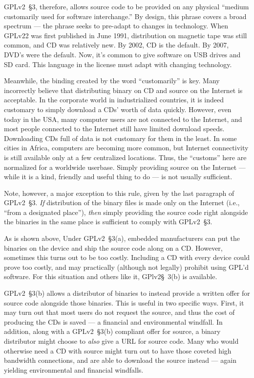 GPLv2~\S3, therefore, allows source code to be provided on any physical
``medium customarily used for software interchange.''  By design, this
phrase covers a broad spectrum --- the phrase seeks to pre-adapt to
changes in  technology.  When GPLv22 was first published in June
1991, distribution on magnetic tape was still common, and CD was
relatively new.  By 2002, CD is the default.  By 2007, DVD's were the
default.  Now, it's common to give software on USB drives and SD card.  This
language in the license must adapt with changing technology.

Meanwhile, the binding created by the word ``customarily'' is key.  Many
incorrectly believe that distributing binary on CD and source on the
Internet is acceptable.  In the corporate world in industrialized countries, it is indeed customary to
simply download a CDs' worth of data quickly.  However, even today in the USA, many computer users are not connected to the Internet, and most people connected
to the Internet still have limited download speeds.  Downloading
CDs full of data is not customary for them in the least.  In some cities
in Africa, computers are becoming more common, but Internet connectivity
is still available only at a few centralized locations.  Thus, the
``customs'' here are normalized for a worldwide userbase.  Simply
providing source on the Internet --- while it is a kind, friendly and
useful thing to do --- is not usually sufficient.

Note, however, a major exception to this rule, given by the last paragraph
of GPLv2~\S3. \emph{If} distribution of the binary files is made only on the
Internet (i.e., ``from a designated place''), \emph{then} simply providing
the source code right alongside the binaries in the same place is
sufficient to comply with GPLv2~\S3.

\medskip

As is shown above, Under GPLv2~\S3(a), embedded manufacturers can put the
binaries on the device and ship the source code along on a CD\@.  However,
sometimes this turns out to be too costly.  Including a CD with every
device could prove too costly, and may practically (although not legally)
prohibit using GPL'd software. For this situation and others like it, GPlv2\S~3(b) is available.

GPLv2~\S3(b) allows a distributor of binaries to instead provide a written
offer for source code alongside those binaries.  This is useful in two
specific ways.  First, it may turn out that most users do not request the
source, and thus the cost of producing the CDs is saved --- a financial
and environmental windfall.  In addition, along with a GPLv2~\S3(b) compliant
offer for source, a binary distributor might choose to \emph{also} give a
URL for source code.  Many who would otherwise need a CD with source might
turn out to have those coveted high bandwidth connections, and are able to
download the source instead --- again yielding environmental and financial
windfalls.

